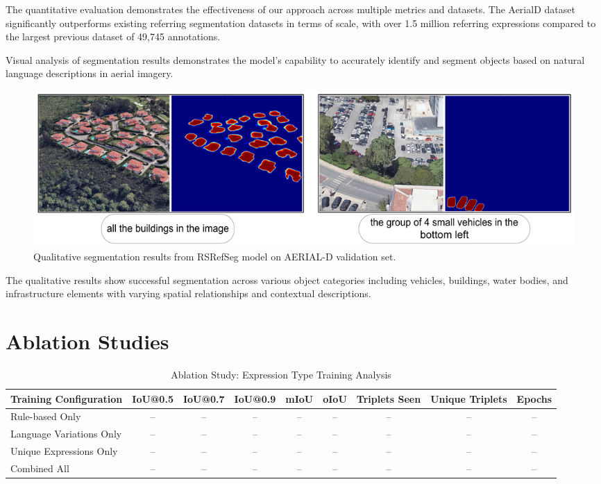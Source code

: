 The quantitative evaluation demonstrates the effectiveness of our approach across multiple metrics and datasets. The AerialD dataset significantly outperforms existing referring segmentation datasets in terms of scale, with over 1.5 million referring expressions compared to the largest previous dataset of 49,745 annotations.

Visual analysis of segmentation results demonstrates the model's capability to accurately identify and segment objects based on natural language descriptions in aerial imagery.

\begin{figure}[H]
\centering
\includegraphics[width=\textwidth]{./Images/qualitative.png}
\caption{Qualitative segmentation results from RSRefSeg model on AERIAL-D validation set.}
\label{fig:qualitative_examples}
\end{figure}

The qualitative results show successful segmentation across various object categories including vehicles, buildings, water bodies, and infrastructure elements with varying spatial relationships and contextual descriptions.

\section{Ablation Studies}

\begin{table}[H]
\centering
\caption{Ablation Study: Expression Type Training Analysis}
\label{tab:ablation_expression_types}
{\footnotesize
\begin{tabular}{@{}p{3.2cm}cccccccc@{}}
\toprule
\textbf{Training Configuration} & \textbf{IoU@0.5} & \textbf{IoU@0.7} & \textbf{IoU@0.9} & \textbf{mIoU} & \textbf{oIoU} & \textbf{Triplets Seen} & \textbf{Unique Triplets} & \textbf{Epochs} \\
\midrule
Rule-based Only & -- & -- & -- & -- & -- & -- & -- & -- \\
Language Variations Only & -- & -- & -- & -- & -- & -- & -- & -- \\
Unique Expressions Only & -- & -- & -- & -- & -- & -- & -- & -- \\
Combined All & -- & -- & -- & -- & -- & -- & -- & -- \\
\bottomrule
\end{tabular}%
}
\end{table}


